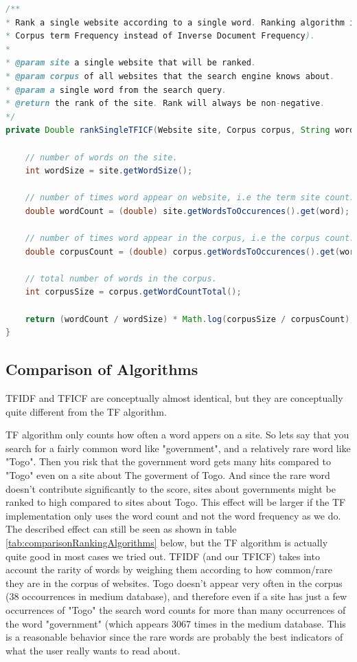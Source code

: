 \begin{lstlisting}[language=Java, caption=This is a code example., label=lst:TFICF]
  /**
* Rank a single website according to a single word. Ranking algorithm is TFICF (i.e Inverse
* Corpus term Frequency instead of Inverse Document Frequency).
* 
* @param site a single website that will be ranked.
* @param corpus of all websites that the search engine knows about.
* @param a single word from the search query.
* @return the rank of the site. Rank will always be non-negative.
*/
private Double rankSingleTFICF(Website site, Corpus corpus, String word) {

	// number of words on the site.
	int wordSize = site.getWordSize();
	
	// number of times word appear on website, i.e the term site count.
	double wordCount = (double) site.getWordsToOccurences().get(word);
	
	// number of times word appear in the corpus, i.e the corpus count.
	double corpusCount = (double) corpus.getWordsToOccurences().get(word);
	
	// total number of words in the corpus.
	int corpusSize = corpus.getWordCountTotal();
	
	return (wordCount / wordSize) * Math.log(corpusSize / corpusCount);
}
\end{lstlisting}




\subsection{Comparison of Algorithms}
TFIDF and TFICF are conceptually almost identical, but they are conceptually quite different from the TF algorithm. 

TF algorithm only counts how often a word appers on a site. So lets say that you search for a fairly common word like "government", and a relatively rare word like "Togo". Then you risk that the government word gets many hits compared to "Togo" even on a site about The goverment of Togo. And since the rare word doesn't contribute significantly to the score, sites about governments might be ranked to high compared to sites about Togo. 
This effect will be larger if the TF implementation only uses the word count and not the word frequency as we do. The described effect can still be seen as shown in table \ref{tab:comparisonRankingAlgorithms} below, but the TF algorithm is actually quite good in most cases we tried out.   
TFIDF (and our TFICF) takes into account the rarity of words by weighing them according to how common/rare they are in the corpus of websites. 
Togo doesn't appear very often in the corpus (38 occourrences in medium database), and therefore even if a site has just a few occurrences of "Togo" the search word counts for more than many occurrences of the word "government" (which appears 3067 times in the medium database.
This is a reasonable behavior since the rare words are probably the best indicators of what the user really wants to read about.  


